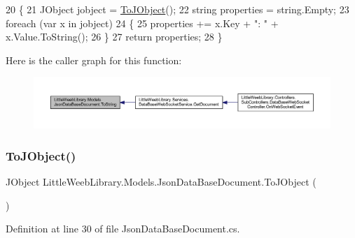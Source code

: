 \begin{DoxyCode}
20         \{
21             JObject jobject = \mbox{\hyperlink{class_little_weeb_library_1_1_models_1_1_json_data_base_document_ae582e7c7033e71722913fe3b620ac80c}{ToJObject}}();
22             \textcolor{keywordtype}{string} properties = \textcolor{keywordtype}{string}.Empty;
23             \textcolor{keywordflow}{foreach} (var x \textcolor{keywordflow}{in} jobject)
24             \{
25                 properties += x.Key + \textcolor{stringliteral}{": "} + x.Value.ToString();
26             \}
27             \textcolor{keywordflow}{return} properties;
28         \}
\end{DoxyCode}
Here is the caller graph for this function\+:\nopagebreak
\begin{figure}[H]
\begin{center}
\leavevmode
\includegraphics[width=350pt]{class_little_weeb_library_1_1_models_1_1_json_data_base_document_a0a84a997c39ac76d99382cdabf9227bf_icgraph}
\end{center}
\end{figure}
\mbox{\label{class_little_weeb_library_1_1_models_1_1_json_data_base_document_ae582e7c7033e71722913fe3b620ac80c}} 
\subsubsection{\texorpdfstring{To\+J\+Object()}{ToJObject()}}
{\footnotesize\ttfamily J\+Object Little\+Weeb\+Library.\+Models.\+Json\+Data\+Base\+Document.\+To\+J\+Object (\begin{DoxyParamCaption}{ }\end{DoxyParamCaption})}



Definition at line 30 of file Json\+Data\+Base\+Document.\+cs.


